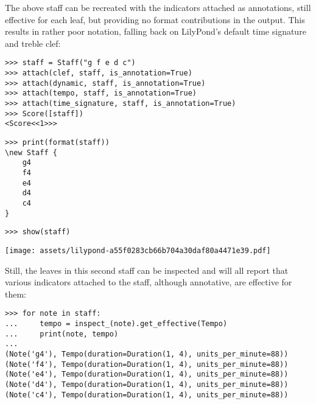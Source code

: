 \noindent The above staff can be recreated with the indicators attached as
annotations, still effective for each leaf, but providing no format
contributions in the output. This results in rather poor notation, falling back
on LilyPond's default  time signature and treble clef:

\begin{comment}
<abjad>
staff = Staff("g f e d c")
attach(clef, staff, is_annotation=True)
attach(dynamic, staff, is_annotation=True)
attach(tempo, staff, is_annotation=True)
attach(time_signature, staff, is_annotation=True)
Score([staff])
print(format(staff))
show(staff)
</abjad>
\end{comment}

\begin{abjadbookoutput}
\begin{singlespacing}
\vspace{-0.5\baselineskip}
\begin{verbatim}
>>> staff = Staff("g f e d c")
>>> attach(clef, staff, is_annotation=True)
>>> attach(dynamic, staff, is_annotation=True)
>>> attach(tempo, staff, is_annotation=True)
>>> attach(time_signature, staff, is_annotation=True)
>>> Score([staff])
<Score<<1>>>
\end{verbatim}
\begin{verbatim}
>>> print(format(staff))
\new Staff {
    g4
    f4
    e4
    d4
    c4
}
\end{verbatim}
\begin{verbatim}
>>> show(staff)
\end{verbatim}
\noindent\texttt{[image: assets/lilypond-a55f0283cb66b704a30daf80a4471e39.pdf]}
\end{singlespacing}
\end{abjadbookoutput}

\noindent Still, the leaves in this second staff can be inspected and will all
report that various indicators attached to the staff, although annotative, are
effective for them:

\begin{comment}
<abjad>
for note in staff:
    tempo = inspect_(note).get_effective(Tempo)
    print(note, tempo)

</abjad>
\end{comment}

\begin{abjadbookoutput}
\begin{singlespacing}
\vspace{-0.5\baselineskip}
\begin{verbatim}
>>> for note in staff:
...     tempo = inspect_(note).get_effective(Tempo)
...     print(note, tempo)
...
(Note('g4'), Tempo(duration=Duration(1, 4), units_per_minute=88))
(Note('f4'), Tempo(duration=Duration(1, 4), units_per_minute=88))
(Note('e4'), Tempo(duration=Duration(1, 4), units_per_minute=88))
(Note('d4'), Tempo(duration=Duration(1, 4), units_per_minute=88))
(Note('c4'), Tempo(duration=Duration(1, 4), units_per_minute=88))
\end{verbatim}
\end{singlespacing}
\end{abjadbookoutput}

